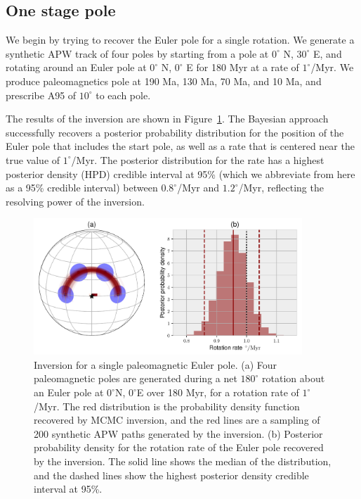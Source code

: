 \documentclass[preprint,12pt,authoryear]{elsarticle}
\begin{document}
\subsection{One stage pole}
\label{sec:one_stage_pole}
We begin by trying to recover the Euler pole for a single rotation.
We generate a synthetic APW track of four poles by starting from a pole at $0^\circ$ N, $30^\circ$ E,
and rotating around an Euler pole at $0^\circ$ N, $0^\circ$ E for 180 Myr at a rate of $1^\circ$/Myr.
We produce paleomagnetics pole at 190 Ma, 130 Ma, 70 Ma, and 10 Ma, and prescribe A95
of $10^\circ$ to each pole.

The results of the inversion are shown in Figure~\ref{fig:one_euler_pole}.
The Bayesian approach successfully recovers a posterior probability distribution for the position
of the Euler pole that includes the start pole, as well as a rate that is centered
near the true value of $1^\circ$/Myr. The posterior distribution for the rate
has a highest posterior density (HPD) credible interval at 95\% 
(which we abbreviate from here as a 95\% credible interval)
between $0.8^\circ$/Myr and $1.2^\circ$/Myr, reflecting the resolving power of the inversion.

\begin{figure}
\includegraphics[width=0.9\textwidth]{figures/synthetic/one_euler_pole.pdf}
\caption[Inversion for a single paleomagnetic Euler pole.]{Inversion for a single paleomagnetic Euler pole. (a) Four paleomagnetic poles are generated during a net $180^\circ$ rotation about an Euler pole at $0^\circ$N, $0^\circ$E over 180 Myr, for a rotation rate of $1^\circ$/Myr. The red distribution is the probability density function recovered by MCMC inversion, and the red lines are a sampling of 200 synthetic APW paths generated by the inversion. (b) Posterior probability density for the rotation rate of the Euler pole recovered by the inversion. The solid line shows the median of the distribution, and the dashed lines show the highest posterior density credible interval at 95\%. }
\label{fig:one_euler_pole}
\end{figure}
\end{document}
